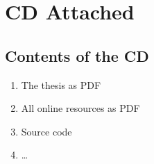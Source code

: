 
\section{CD Attached}
\label{sec:CDAttached}

\subsection{Contents of the CD}
\label{subsec:ContentsCD}

\begin{enumerate}
	\item The thesis as PDF
	\item All online resources as PDF
	\item Source code
	\item \ldots
\end{enumerate}